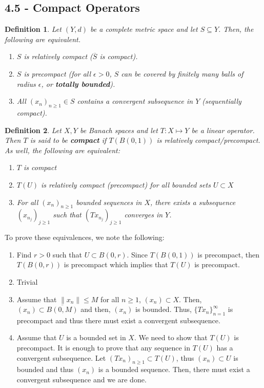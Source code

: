 \documentclass[12pt]{article}
\newtheorem{definition}{Definition}
\newcommand{\sbs}{\subset}
\newcommand{\sse}{\subseteq}
\begin{document}
\subsection*{4.5 - Compact Operators}
\begin{definition}
Let $(Y, d)$ be a complete metric space and let $S \sse Y$. Then, the following are equivalent.
\begin{enumerate}[topsep=-15pt]
\item $S$ is relatively compact ($\overline{S}$ is compact).
\item $S$ is precompact (for all $\epsilon > 0$, $S$ can be covered by finitely many balls of radius $\epsilon$, or \textbf{totally bounded}).
\item All $(x_n)_{n \geq 1} \in S$ contains a convergent subsequence in $Y$ (sequentially compact).
\end{enumerate}
\end{definition}
\begin{definition}
Let $X, Y$ be Banach spaces and let $T: X \mapsto Y$ be a linear operator. Then $T$ is said to be \textbf{compact} if $T(B(0,1))$ is relatively compact/precompact. As well, the following are equivalent:
\begin{enumerate}[topsep=-15pt, itemsep=0pt]
\item[(1)] $T$ is compact
\item[(2)] $T(U)$ is relatively compact (precompact) for all bounded sets $U \sbs X$
\item[(3)] For all $(x_n)_{n\geq 1}$ bounded sequences in $X$, there exists a subsequence $(x_{n_j})_{j \geq 1}$ such that $\left( Tx_{n_j} \right)_{j \geq 1}$ converges in $Y$. 
\end{enumerate}
\end{definition}
\vspace{-15pt}
To prove these equivalences, we note the following:
\begin{enumerate}[topsep=-15pt, itemsep=0pt]
\item[$(1) \rightarrow (2)$:] Find $r >0$ such that $U \sbs B(0, r)$. Since $T(B(0,1))$ is precompact, then $T(B(0, r))$ is precompact which implies that $T(U)$ is precompact.
\item[$(2) \rightarrow (1)$:] Trivial
\item[$(2) \rightarrow (3)$:] Assume that $\| x_n \| \leq M$ for all $n \geq 1$, $(x_n ) \sbs X$. Then, $(x_n) \sbs \overline{B(0, M)}$ and then, $(x_n)$ is bounded. Thus, $\{ Tx_n \}_{n=1}^{\infty}$ is precompact and thus there must exist a convergent subsequence. 
\item[$(3) \rightarrow (2)$:] Assume that $U$ is a bounded set in $X$. We need to show that $T(U)$ is precompact. It is enough to prove that any sequence in $T(U)$ has a convergent subsequence. Let $(Tx_n)_{n\geq 1} \sbs T(U)$, thus $(x_n) \sbs U$ is bounded and thus $(x_n)$ is a bounded sequence. Then, there must exist a convergent subsequence and we are done.  
\end{enumerate}
\end{document}
